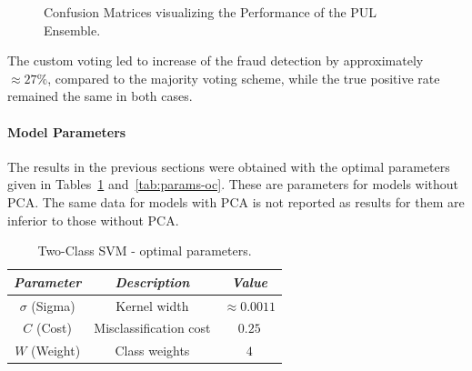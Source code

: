 \begin{figure}[ht!]
\begin{multicols}{3}
\end{multicols}
\caption{Confusion Matrices visualizing the Performance of the PUL Ensemble.}
\label{tables:confusion-matrices-ensemble}
\end{figure}
The custom voting led to increase of the fraud detection by approximately \(\approx27\%\), compared to the majority voting scheme, while the true positive rate remained the same in both cases.

\paragraph*{Model Parameters} \hfill \break
The results in the previous sections were obtained with the optimal parameters given in Tables~\ref{tab:params-twoc} and~\ref{tab:params-oc}. These are parameters for models without PCA. The same data for models with PCA is not reported as results for them are inferior to those without PCA.

\begin{table}[ht!]
  \begin{center}
    \caption{Two-Class SVM - optimal parameters.}
    \label{tab:params-twoc}
    \begin{tabular}{|c|c|c|}\hline
    \textit{Parameter} & \textit{Description} & \textit{Value} \\
      \hline
    \(\sigma\) (Sigma) & Kernel width & \(\approx 0.0011\) \\ 
     \hline
     \(C\) (Cost) & Misclassification cost &  \(0.25\) \\
     \hline
     \(W\) (Weight) & Class weights & \(4\) \\
     \hline
    \end{tabular}
  \end{center}
\end{table}

